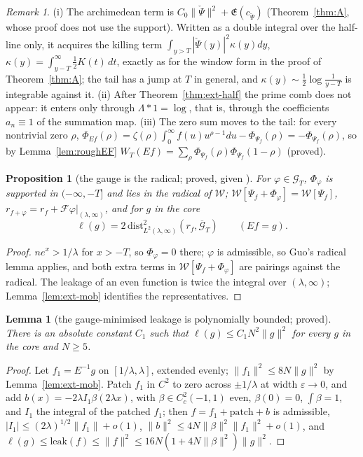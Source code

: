 \documentclass[11pt]{amsart}
\newtheorem{proposition}[theorem]{Proposition}
\newtheorem{lemma}[theorem]{Lemma}
\theoremstyle{definition}
\theoremstyle{remark}
\newtheorem{remark}[theorem]{Remark}
\newcommand{\Lev}{\mathfrak E}
\begin{document}
\begin{remark}\label{rem:ext-killing}
(i) The archimedean term is $C_0\|\check\Psi\|^2+\Lev(c_{\check\Psi})$ (Theorem~\ref{thm:A}, whose proof does not use the
support). Written as a double integral over the half-line only, it acquires the killing term
$\int_{y>T}|\check\Psi(y)|^2\kappa(y)dy$, $\kappa(y)=\int_{y-T}^\infty\frac12K(t)\,dt$, exactly as for the window form in the
proof of Theorem~\ref{thm:A}; the tail has a jump at $T$ in general, and $\kappa(y)\sim\frac12\log\frac1{y-T}$ is integrable
against it. (ii) After Theorem~\ref{thm:ext-half} the prime comb does not appear: it enters only through
$\Lambda*1=\log$, that is, through the coefficients $a_n\equiv1$ of the summation map. (iii) The zero sum moves to the tail:
for every nontrivial zero $\rho$, $\Phi_{Ef}(\rho)=\zeta(\rho)\int_0^\infty f(u)u^{\rho-1}du-\Phi_{\Psi_f}(\rho)
=-\Phi_{\Psi_f}(\rho)$, so by Lemma~\ref{lem:roughEF} $W_T(Ef)=\sum_\rho\Phi_{\Psi_f}(\rho)\Phi_{\Psi_f}(1-\rho)$ (proved).
\end{remark}

\begin{proposition}[{the gauge is the radical; proved, given \cite[Lemma~4.4]{Guo2026}}]\label{prop:ext-gauge}
For $\varphi\in\mathcal G_T$, $\Phi_\varphi$ is supported in $(-\infty,-T]$ and lies in the radical of $\mathcal W$;
$\mathcal W[\Psi_f+\Phi_\varphi]=\mathcal W[\Psi_f]$, $r_{f+\varphi}=r_f+\mathcal F\varphi|_{(\lambda,\infty)}$, and for $g$ in the core
\[
\ell(g)=2\,\mathrm{dist}^2_{L^2(\lambda,\infty)}(r_f,\overline{\mathcal G}_T)\qquad(Ef=g).
\]
\end{proposition}
\begin{proof}
$ne^x>1/\lambda$ for $x>-T$, so $\Phi_\varphi=0$ there; $\varphi$ is admissible, so Guo's radical lemma applies, and both extra
terms in $\mathcal W[\Psi_f+\Phi_\varphi]$ are pairings against the radical. The leakage of an even function is twice the
integral over $(\lambda,\infty)$; Lemma~\ref{lem:ext-mob} identifies the representatives.
\end{proof}

\begin{lemma}[the gauge-minimised leakage is polynomially bounded; proved]\label{lem:ext-ellbound}
There is an absolute constant $C_1$ such that $\ell(g)\le C_1N^2\|g\|^2$ for every $g$ in the core and $N\ge5$.
\end{lemma}
\begin{proof}
Let $f_1=E^{-1}g$ on $[1/\lambda,\lambda]$, extended evenly; $\|f_1\|^2\le8N\|g\|^2$ by Lemma~\ref{lem:ext-mob}. Patch $f_1$ in
$C^2$ to zero across $\pm1/\lambda$ at width $\varepsilon\to0$, and add $b(x)=-2\lambda I_1\beta(2\lambda x)$, with $\beta\in
C_c^2(-1,1)$ even, $\beta(0)=0$, $\int\beta=1$, and $I_1$ the integral of the patched $f_1$; then $f=f_1+\text{patch}+b$ is
admissible, $|I_1|\le(2\lambda)^{1/2}\|f_1\|+o(1)$, $\|b\|^2\le4N\|\beta\|^2\|f_1\|^2+o(1)$, and $\ell(g)\le\mathrm{leak}(f)\le\|f\|^2
\le16N(1+4N\|\beta\|^2)\|g\|^2$.
\end{proof}
\end{document}
